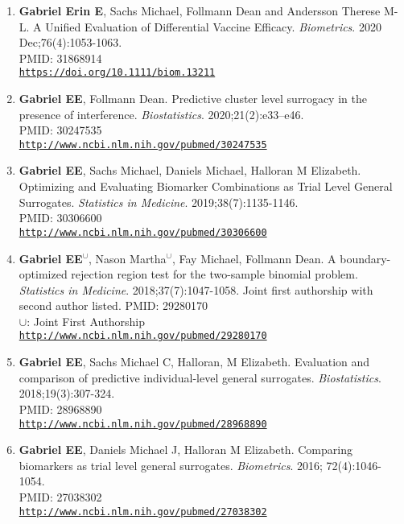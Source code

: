 \documentclass[12pt]{article}
\providecommand \url[1]{\href{#1}{#1}}
\renewcommand*\url[1]{\href{#1}{\texttt{#1}}}
\begin{document}
\begin{enumerate}
\item \textbf{Gabriel Erin E}, Sachs  Michael, Follmann Dean and  Andersson  Therese M-L. A Unified Evaluation of Differential Vaccine Efficacy. \emph{Biometrics}. 2020 Dec;76(4):1053-1063.\\
PMID: 31868914\\
\url{https://doi.org/10.1111/biom.13211}




\item \textbf{Gabriel EE}, Follmann Dean. Predictive cluster level surrogacy in the presence of interference. \emph{Biostatistics}. 2020;21(2):e33–e46.\\
PMID: 30247535\\
\url{http://www.ncbi.nlm.nih.gov/pubmed/30247535}




\item \textbf{Gabriel EE}, Sachs Michael, Daniels Michael, Halloran M Elizabeth. Optimizing and Evaluating Biomarker Combinations as Trial Level General Surrogates.  \emph{Statistics in Medicine}. 2019;38(7):1135-1146.\\
PMID: 30306600\\
\url{http://www.ncbi.nlm.nih.gov/pubmed/30306600}


\item \textbf{Gabriel EE}$^\cup$, Nason Martha$^\cup$, Fay Michael, Follmann Dean. A boundary-optimized rejection region test for the two-sample binomial problem. \emph{Statistics in Medicine}. 2018;37(7):1047-1058. Joint first authorship with second author listed.
PMID: 29280170\\
$ \cup$: Joint First Authorship\\
\url{http://www.ncbi.nlm.nih.gov/pubmed/29280170}


\item \textbf{Gabriel EE}, Sachs Michael C, Halloran, M Elizabeth. Evaluation and comparison of predictive individual-level general surrogates. \emph{Biostatistics}. 2018;19(3):307-324.\\
PMID: 28968890\\
\url{http://www.ncbi.nlm.nih.gov/pubmed/28968890}


\item \textbf{Gabriel  EE}, Daniels  Michael J, Halloran  M Elizabeth. 	Comparing biomarkers as trial level general surrogates. \emph{Biometrics}. 2016; 72(4):1046-1054.\\
PMID: 27038302\\
\url{http://www.ncbi.nlm.nih.gov/pubmed/27038302}




\end{enumerate}
\end{document}
